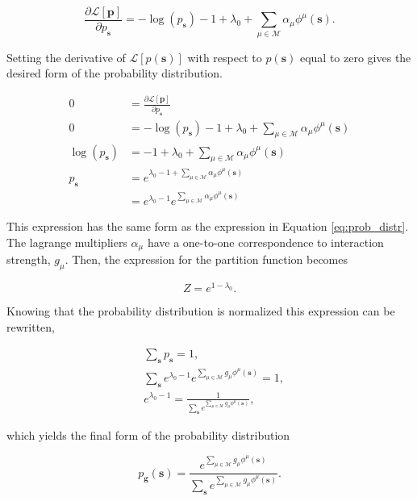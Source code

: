 \begin{equation}
    \frac{\partial \mathcal{L}[\mathbf{p}]}{\partial p_\mathbf{s}} = - \log(p_{\mathbf{s}}) - 1 + \lambda_0 + \sum_{\mu \in \mathcal{M}} \alpha_\mu \phi^\mu(\mathbf{s}).
\end{equation}

\noindent
Setting the derivative of $\mathcal{L}[p(\mathbf{s})]$ with respect to $p(\mathbf{s})$ equal to zero gives the desired form of the probability distribution.

\begin{align*}
    0 &= \frac{\partial \mathcal{L}[\mathbf{p}]}{\partial p_\mathbf{s}}\\
    0 &= - \log(p_{\mathbf{s}}) - 1 + \lambda_0 + \sum_{\mu \in \mathcal{M}} \alpha_\mu \phi^\mu(\mathbf{s}) \\
    \log(p_{\mathbf{s}}) &= - 1 + \lambda_0 + \sum_{\mu \in \mathcal{M}} \alpha_\mu \phi^\mu(\mathbf{s})\\
    p_{\mathbf{s}} &= e^{\lambda_0 - 1 + \sum_{\mu \in \mathcal{M}} \alpha_\mu \phi^\mu(\mathbf{s})}\\
    &= e^{\lambda_0 - 1} e^{ \sum_{\mu \in \mathcal{M}} \alpha_\mu \phi^\mu(\mathbf{s})}
\end{align*}

\noindent
This expression has the same form as the expression in Equation \ref{eq:prob_distr}. The lagrange multipliers $\alpha_\mu$ have a one-to-one correspondence to interaction strength, $g_\mu$.
Then, the expression for the partition function becomes

\begin{equation*}
    Z = e^{1 - \lambda_0}.
\end{equation*}

\noindent
Knowing that the probability distribution is normalized this expression can be rewritten,

\begin{align*}
  &\sum_{\mathbf{s}} p_{\mathbf{s}} = 1, \\
  &\sum_{\mathbf{s}}  e^{\lambda_0 - 1} e^{\sum_{\mu \in \mathcal{M}} g_\mu \phi^\mu(\mathbf{s})} = 1, \\
  &e^{\lambda_0 - 1} = \frac{1}{\sum_{\mathbf{s}} e^{\sum_{\mu \in \mathcal{M}} g_\mu \phi^\mu(\mathbf{s})}},
\end{align*}

\noindent
which yields the final form of the probability distribution

\begin{equation}
  p_{\mathbf{g}}(\mathbf{s}) = \frac{e^{\sum_{\mu \in \mathcal{M}} g_\mu \phi^\mu(\mathbf{s})}}{\sum_{\mathbf{s}} e^{\sum_{\mu \in \mathcal{M}} g_\mu \phi^\mu(\mathbf{s})}}.
\end{equation}

